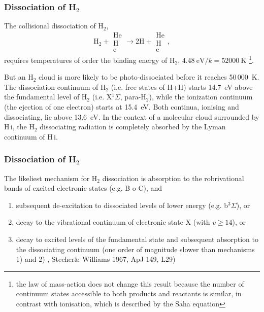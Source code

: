 \begin{frame}\frametitle{Dissociation of  H$_2$}

The collisional dissociation of  H$_2$,
\[\mathrm{H}_2 + \begin{array}{c}\mathrm{He}\\\mathrm{H}\\\mathrm{e}
\end{array} \rightarrow 2\mathrm{H} +  \begin{array}{c}\mathrm{He}\\\mathrm{H}\\\mathrm{e}
\end{array},\] requires temperatures of order the binding energy of  H$_2$, $4\mathrm{.}48~\mathrm{eV}/k = 52000~$K
\footnote{the  law of mass-action does not change this
result because the number of continuum states accessible to both
products and reactants is similar, in contrast with 
ionisation, which is described by the Saha equation}.

But an H$_2$ cloud is more likely to be photo-dissociated before it
reaches 50\,000~K. The dissociation continuum of H$_2$ (i.e. free
states of H+H) starts 14.7~eV above the fundamental level of H$_2$
(i.e. X$^{1}\Sigma$, para-H$_2$), while the ionization continuum (the
ejection of one electron) starts at 15.4~eV. Both continua, ionising
and dissociating, lie above 13.6~eV. In the context of a molecular
cloud surrounded by H\,{\sc i}, the H$_2$ dissociating radiation is
completely absorbed by the Lyman continuum of H\,{\sc i}.

\end{frame} \begin{frame}\frametitle{Dissociation of H$_2$}

The likeliest mechanism for H$_2$ dissociation is absorption to the
robrivational bands of excited electronic states (e.g. B o C), and
\begin{enumerate}
\item subsequent  de-excitation to dissociated levels of lower energy
 (e.g. b$^3\Sigma$), or \label{it:1mecah2}
\item  decay to the vibrational continuum of electronic state X (with
$v \ge 14$), or  \label{it:2mecah2}
\item decay to excited levels of the fundamental state and subsequent
absorption to the dissociating continuum (one order of magnitude
slower than mechanisms 1) and 2)  
, Stecher\& Williams 1967, ApJ 149, L29)
\end{enumerate}
  

\end{frame}
